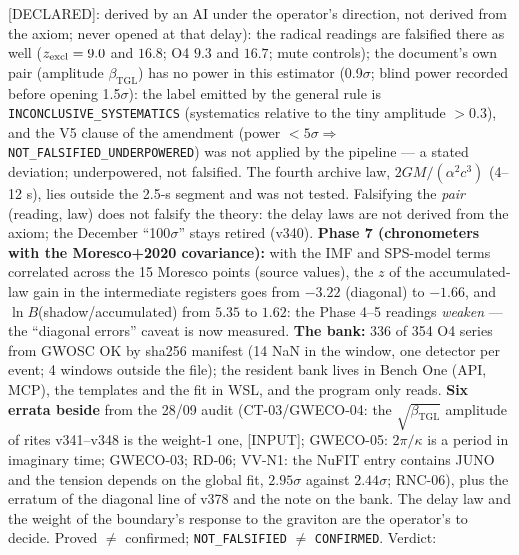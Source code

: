 \documentclass[11pt]{article}
\newcommand{\bTGL}{\beta_{\mathrm{TGL}}}\newcommand{\Msun}{M_{\odot}}\newcommand{\TGL}{\mathrm{TGL}}
\theoremstyle{definition}\newtheorem{deriv}{Derivation}
\begin{document}
\textsf{[DECLARED]}: derived by an AI under the operator's direction, not derived from the axiom; never opened at that delay): the radical readings are falsified there as well ($z_{\rm excl}=9.0$ and $16.8$; O4 $9.3$ and $16.7$; mute controls); the document's own pair (amplitude $\bTGL$) has no power in this estimator (0.9$\sigma$; blind power recorded before opening 1.5$\sigma$): the label emitted by the general rule is \texttt{INCONCLUSIVE\_SYSTEMATICS} (systematics relative to the tiny amplitude $>0.3$), and the V5 clause of the amendment (power $<5\sigma\Rightarrow$ \texttt{NOT\_FALSIFIED\_UNDERPOWERED}) was not applied by the pipeline --- a stated deviation; underpowered, not falsified. The fourth archive law, $2GM/(\alpha^2c^3)$ (4--12 s), lies outside the 2.5-s segment and was not tested. Falsifying the \emph{pair} (reading, law) does not falsify the theory: the delay laws are not derived from the axiom; the December ``100$\sigma$'' stays retired (v340). \textbf{Phase 7 (chronometers with the Moresco+2020 covariance):} with the IMF and SPS-model terms correlated across the 15 Moresco points (source values), the $z$ of the accumulated-law gain in the intermediate registers goes from $-3.22$ (diagonal) to $-1.66$, and $\ln B$(shadow/accumulated) from $5.35$ to $1.62$: the Phase 4--5 readings \emph{weaken} --- the ``diagonal errors'' caveat is now measured. \textbf{The bank:} 336 of 354 O4 series from GWOSC OK by sha256 manifest (14 NaN in the window, one detector per event; 4 windows outside the file); the resident bank lives in Bench One (API, MCP), the templates and the fit in WSL, and the program only reads. \textbf{Six errata beside} from the 28/09 audit (CT-03/GWECO-04: the $\sqrt{\bTGL}$ amplitude of rites v341--v348 is the weight-1 one, \textsf{[INPUT]}; GWECO-05: $2\pi/\kappa$ is a period in imaginary time; GWECO-03; RD-06; VV-N1: the NuFIT entry contains JUNO and the tension depends on the global fit, $2.95\sigma$ against $2.44\sigma$; RNC-06), plus the erratum of the diagonal line of v378 and the note on the bank. The delay law and the weight of the boundary's response to the graviton are the operator's to decide. Proved $\neq$ confirmed; \texttt{NOT\_FALSIFIED} $\neq$ \texttt{CONFIRMED}. Verdict: 
\end{document}
